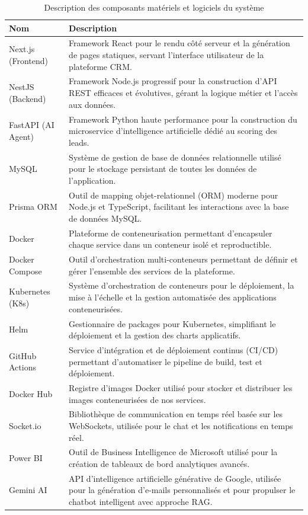\begin{table}[H]
\centering
\renewcommand{\arraystretch}{1.4}
\begin{tabular}{|p{3.5cm}|p{10cm}|}
\hline
\textbf{Nom} & \textbf{Description} \\
\hline
Next.js (Frontend) & Framework React pour le rendu côté serveur et la génération de pages statiques, servant l'interface utilisateur de la plateforme CRM. \\
\hline
NestJS (Backend) & Framework Node.js progressif pour la construction d'API REST efficaces et évolutives, gérant la logique métier et l'accès aux données. \\
\hline
FastAPI (AI Agent) & Framework Python haute performance pour la construction du microservice d'intelligence artificielle dédié au scoring des leads. \\
\hline
MySQL & Système de gestion de base de données relationnelle utilisé pour le stockage persistant de toutes les données de l'application. \\
\hline
Prisma ORM & Outil de mapping objet-relationnel (ORM) moderne pour Node.js et TypeScript, facilitant les interactions avec la base de données MySQL. \\
\hline
Docker & Plateforme de conteneurisation permettant d'encapsuler chaque service dans un conteneur isolé et reproductible. \\
\hline
Docker Compose & Outil d'orchestration multi-conteneurs permettant de définir et gérer l'ensemble des services de la plateforme. \\
\hline
Kubernetes (K8s) & Système d'orchestration de conteneurs pour le déploiement, la mise à l'échelle et la gestion automatisée des applications conteneurisées. \\
\hline
Helm & Gestionnaire de packages pour Kubernetes, simplifiant le déploiement et la gestion des charts applicatifs. \\
\hline
GitHub Actions & Service d'intégration et de déploiement continus (CI/CD) permettant d'automatiser le pipeline de build, test et déploiement. \\
\hline
Docker Hub & Registre d'images Docker utilisé pour stocker et distribuer les images conteneurisées de nos services. \\
\hline
Socket.io & Bibliothèque de communication en temps réel basée sur les WebSockets, utilisée pour le chat et les notifications en temps réel. \\
\hline
Power BI & Outil de Business Intelligence de Microsoft utilisé pour la création de tableaux de bord analytiques avancés. \\
\hline
Gemini AI & API d'intelligence artificielle générative de Google, utilisée pour la génération d'e-mails personnalisés et pour propulser le chatbot intelligent avec approche RAG. \\
\hline
\end{tabular}
\caption{Description des composants matériels et logiciels du système}
\label{tab:composants}
\end{table}

